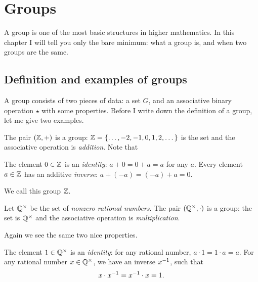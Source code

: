 \chapter{Groups}
\label{ch:group_intro}
A group is one of the most basic structures in higher mathematics.
In this chapter I will tell you only the bare minimum:
what a group is, and when two groups are the same.

\section{Definition and examples of groups}

A group consists of two pieces of data: a set $G$,
and an associative binary operation $\star$ with some properties.
Before I write down the definition of a group, let me give two examples.

\begin{example}
	The pair $(\mathbb Z, +)$ is a group:
	$\mathbb Z = \left\{ \dots,-2,-1,0,1,2,\dots \right\}$ is the set
	and the associative operation is \emph{addition}.
	Note that
	\begin{itemize}
		\ii The element $0 \in \mathbb Z$ is an \emph{identity}:
		$a+0=0+a = a$ for any $a$.
		\ii Every element $a \in \mathbb Z$ has an additive \emph{inverse}: $a + (-a) = (-a) + a = 0$.
	\end{itemize}
	We call this group $\mathbb Z$.
\end{example}
\begin{example}
	Let $\mathbb Q^\times$ be the set of \emph{nonzero rational numbers}.
	The pair $(\mathbb Q^\times, \cdot)$ is a group:
	the set is $\mathbb Q^\times$
	and the associative operation is \emph{multiplication}.

	Again we see the same two nice properties.
	\begin{itemize}
		\ii The element $1 \in \mathbb Q^\times$ is an \emph{identity}:
		for any rational number, $a \cdot 1 = 1 \cdot a = a$.
		\ii For any rational number $x \in \mathbb Q^\times$,
		we have an inverse $x^{-1}$, such that
		\[ x \cdot x^{-1} = x^{-1} \cdot x = 1. \]
	\end{itemize}
\end{example}

